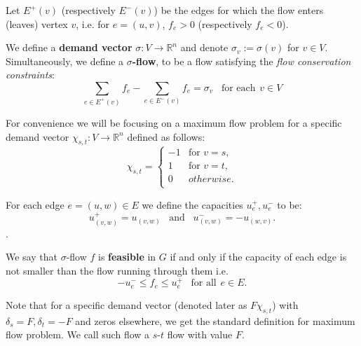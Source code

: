 \begin{definition}
Let $E^+(v)$ (respectively $E^-(v)$) be the edges for which the flow enters (leaves) vertex $v$, i.e. for $e=(u,v)$, $f_e > 0$ (respectively $f_e < 0$).
\end{definition}

\begin{definition}
We define a \textbf{demand vector} $\sigma: V \rightarrow \mathbb{R}^n$ and denote $\sigma_v := \sigma(v)$ for $v \in V$. Simultaneously, we define a $\sigma$\textbf{-flow}, to be a flow satisfying the \textit{flow conservation constraints}:
\begin{equation}
\label{flow_conservation}
\sum_{e \in E^+(v)} f_e - \sum_{e \in E^-(v)} f_e = \sigma_v \hspace{10pt} \text{for each} \hspace{5pt} v \in V
\end{equation}
\end{definition}

For convenience we will be focusing on a maximum flow problem for a specific demand vector $\chi_{s,t}: V \rightarrow \mathbb{R}^n$ defined as follows:
\[ \chi_{s,t} = \begin{cases}
    -1 & \text{for } v = s, \\
    1 & \text{for } v = t, \\
    0 & otherwise.  \\
  \end{cases} \]

\begin{definition}
For each edge $e=(u,w)\in E$ we define the capacities $u^+_e, u^-_e$ to be:
\[ u^+_{(v,w)} = u_{(v,w)} \hspace{10pt} \text{and} \hspace{10pt} u^-_{(v,w)} = -u_{(w,v)}. \].
\end{definition}

\begin{definition}
We say that $\sigma$-flow $f$ is \textbf{feasible} in $G$ if and only if the capacity of each edge is not smaller than the flow running through them i.e.
\[ -u^-_e \le f_e \le u^+_e \hspace{10pt} \text{for all} \hspace{5pt} e\in E.\]
\end{definition}


Note that for a specific demand vector (denoted later as $F\chi_{s,t}$) with $\delta_s=F, \delta_t=-F$ and zeros elsewhere, we get the standard definition for maximum flow problem.
We call such flow a $s$-$t$ flow with value $F$.

